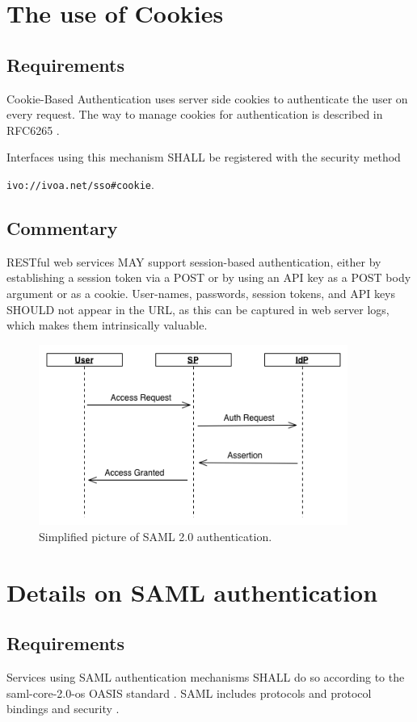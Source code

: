 \documentclass[11pt,a4paper]{ivoa}
\begin{document}
\section{The use of Cookies}
\subsection{Requirements}
Cookie-Based Authentication uses server side cookies to authenticate the user on every request. 
The way to manage  cookies for authentication is described in RFC6265 \citep{std:RFC6265}.

Interfaces using this mechanism SHALL  be registered with the security method 

\texttt{ivo://ivoa.net/sso\#cookie}.


\subsection{Commentary}
RESTful web services MAY support  session-based authentication, either by establishing a session token via a POST or
by using an API key as a POST body argument or as a cookie. 
User-names, passwords, session tokens, and API keys SHOULD not appear in the URL, 
as this can be captured in web server logs, which makes them intrinsically valuable.
\begin{figure}
\centering
\includegraphics[width=0.9\textwidth]{SSO_image002.png}
\caption{Simplified picture of SAML 2.0 authentication.}
\label{fig:saml}
\end{figure}

\section{Details on SAML authentication}
\subsection{Requirements}
Services using SAML authentication mechanisms SHALL do so according to the 
saml-core-2.0-os OASIS standard \citep{std:SAML}. 
SAML includes protocols and protocol bindings and security \citep{std:SAMLB}.
\end{document}
